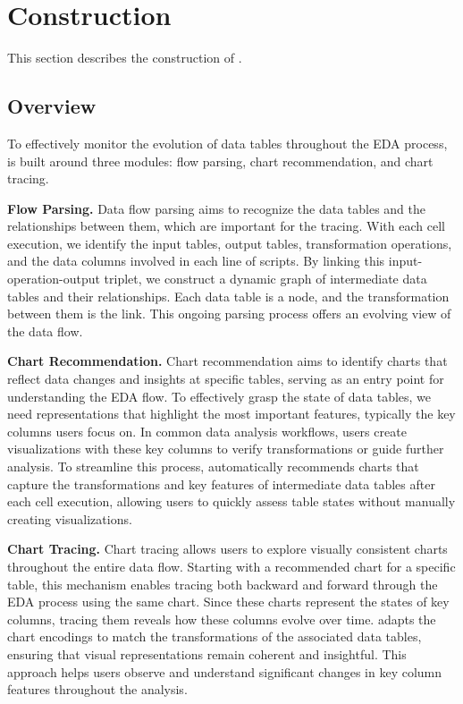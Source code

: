 \section{\system{} Construction}
\label{sec:method}

This section describes the construction of \system{}.

\subsection{Overview}

To effectively monitor the evolution of data tables throughout the EDA process, \system{} is built around three modules: flow parsing, chart recommendation, and chart tracing. 

\textbf{Flow Parsing.}
Data flow parsing aims to recognize the data tables and the relationships between them, which are important for the tracing.
With each cell execution, we identify the input tables, output tables, transformation operations, and the data columns involved in each line of scripts. 
By linking this input-operation-output triplet, we construct a dynamic graph of intermediate data tables and their relationships. 
Each data table is a node, and the transformation between them is the link. 
This ongoing parsing process offers an evolving view of the data flow.

\textbf{Chart Recommendation.}
Chart recommendation aims to identify charts that reflect data changes and insights at specific tables, serving as an entry point for understanding the EDA flow. To effectively grasp the state of data tables, we need representations that highlight the most important features, typically the key columns users focus on. In common data analysis workflows, users create visualizations with these key columns to verify transformations or guide further analysis. To streamline this process, \system{} automatically recommends charts that capture the transformations and key features of intermediate data tables after each cell execution, allowing users to quickly assess table states without manually creating visualizations.


\textbf{Chart Tracing.}
Chart tracing allows users to explore visually consistent charts throughout the entire data flow. Starting with a recommended chart for a specific table, this mechanism enables tracing both backward and forward through the EDA process using the same chart. Since these charts represent the states of key columns, tracing them reveals how these columns evolve over time. \system{} adapts the chart encodings to match the transformations of the associated data tables, ensuring that visual representations remain coherent and insightful. This approach helps users observe and understand significant changes in key column features throughout the analysis.

